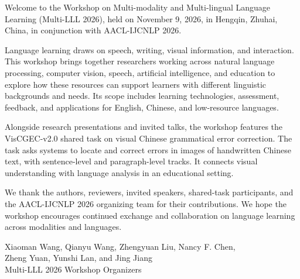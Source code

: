 Welcome to the Workshop on Multi-modality and Multi-lingual Language Learning
(Multi-LLL 2026), held on November 9, 2026, in Hengqin, Zhuhai, China,
in conjunction with AACL-IJCNLP 2026.

Language learning draws on speech, writing, visual information, and interaction.
This workshop brings together researchers working across natural language
processing, computer vision, speech, artificial intelligence, and education to
explore how these resources can support learners with different linguistic
backgrounds and needs. Its scope includes learning technologies, assessment,
feedback, and applications for English, Chinese, and low-resource languages.

Alongside research presentations and invited talks, the workshop features the
VisCGEC-v2.0 shared task on visual Chinese grammatical error correction.
The task asks systems to locate and correct errors in images of handwritten
Chinese text, with sentence-level and paragraph-level tracks. It connects
visual understanding with language analysis in an educational setting.

We thank the authors, reviewers, invited speakers, shared-task participants,
and the AACL-IJCNLP 2026 organizing team for their contributions. We hope the
workshop encourages continued exchange and collaboration on language learning
across modalities and languages.

\bigskip
\noindent Xiaoman Wang, Qianyu Wang, Zhengyuan Liu, Nancy F. Chen,\\
Zheng Yuan, Yunshi Lan, and Jing Jiang\\
Multi-LLL 2026 Workshop Organizers
